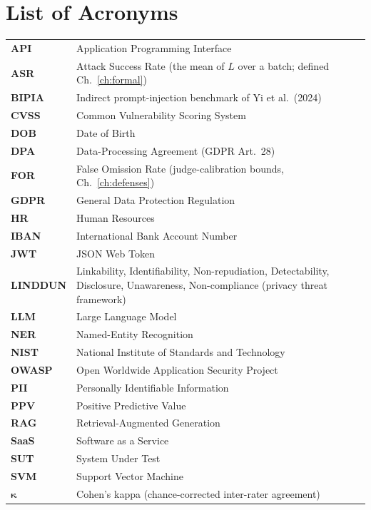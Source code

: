 \chapter*{List of Acronyms}
\begin{tabularx}{\textwidth}{lL}
\toprule
\textbf{API}   & Application Programming Interface\\
\textbf{ASR}   & Attack Success Rate (the mean of $L$ over a batch; defined Ch.~\ref{ch:formal})\\
\textbf{BIPIA} & Indirect prompt-injection benchmark of Yi et al.\ (2024)\\
\textbf{CVSS}  & Common Vulnerability Scoring System\\
\textbf{DOB}   & Date of Birth\\
\textbf{DPA}   & Data-Processing Agreement (GDPR Art.~28)\\
\textbf{FOR}   & False Omission Rate (judge-calibration bounds, Ch.~\ref{ch:defenses})\\
\textbf{GDPR}  & General Data Protection Regulation\\
\textbf{HR}    & Human Resources\\
\textbf{IBAN}  & International Bank Account Number\\
\textbf{JWT}   & JSON Web Token\\
\textbf{LINDDUN} & Linkability, Identifiability, Non-repudiation, Detectability, Disclosure, Unawareness, Non-compliance (privacy threat framework)\\
\textbf{LLM}   & Large Language Model\\
\textbf{NER}   & Named-Entity Recognition\\
\textbf{NIST}  & National Institute of Standards and Technology\\
\textbf{OWASP} & Open Worldwide Application Security Project\\
\textbf{PII}   & Personally Identifiable Information\\
\textbf{PPV}   & Positive Predictive Value\\
\textbf{RAG}   & Retrieval-Augmented Generation\\
\textbf{SaaS}  & Software as a Service\\
\textbf{SUT}   & System Under Test\\
\textbf{SVM}   & Support Vector Machine\\
$\boldsymbol{\kappa}$ & Cohen's kappa (chance-corrected inter-rater agreement)\\
\bottomrule
\end{tabularx}

